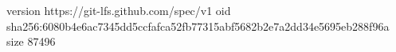 version https://git-lfs.github.com/spec/v1
oid sha256:6080b4e6ac7345dd5ccfafca52fb77315abf5682b2e7a2dd34e5695eb288f96a
size 87496
